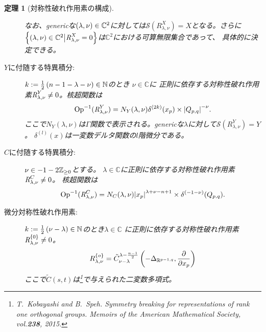 \documentclass[12pt]{msjproc} %
\newcommand{\tmtextit}[1]{{\itshape{#1}}}
\newtheorem{theorem}{定理}
\newtheorem{corollary}{系}
\theoremstyle{definition}
\newcommand{\Hom}{\mbox{\normalfont Hom}}
\newcommand{\Op}{\mbox{\normalfont Op}}
\newcommand{\OpR}{\mbox{\it R}}
\theoremstyle{remark}
\begin{document}
\begin{theorem}[対称性破れ作用素の構成]
\begin{description}
				なお、genericな$(\lambda,\nu)\in\mathbb{C}^2$に対しては$\mathcal{S}(R_{\lambda,\nu}^X)=X$となる。さらに
				$\mysetn{(\lambda,\nu)\in\mathbb{C}^2}{\OpR^{X}_{\lambda,\nu}=0}$は$\mathbb{C}^2$における可算無限集合であって、
				具体的に決定できる。
				\newcommand{\sniptA}{$k:=\frac{1}{2}\left( n-1-\lambda-\nu \right)\in\N$のとき}
				\newcommand{\sniptB}{核超関数は}
				\newcommand{\sniptE}{\sniptB}
				\newcommand{\sniptC}{ここで$N_Y(\lambda,\nu)$は$\Gamma$関数で表示される}
				\newcommand{\sniptF}{genericな$\lambda$に対して$\mathcal{S}\left( R_{\lambda,\nu}^C \right)=C$}
				\newcommand{\sniptD}{genericな$\lambda$に対して$\mathcal{S}\left( R_{\lambda,\nu}^Y \right)=Y$}
				\newcommand{\sniptG}{$k:=\frac{1}{2}\left( \nu-\lambda \right)\in\N$のとき}
				\newcommand{\sniptH}{R_{\lambda,\nu}^{ \left\{ o \right\}}=\tilde{C}_{\nu-\lambda}^{\lambda-\frac{n-1}{2}}\mybra{-\Delta_{\R^{p-1,q}},\frac{\partial}{\partial x_p}}}
			\item[$Y$に付随する特異積分:]
				\sniptA
				$\nu\in\mathbb{C}$に
				正則に依存する対称性破れ作用素$\OpR^{Y}_{\lambda,\nu}\neq0$。\sniptB
					\vspace{-1.8ex}
						\[\Op^{-1}(\OpR^{Y}_{\lambda,\nu})={N_Y(\lambda,\nu)}{\delta^{(2k)}(x_p)\times\myabs{Q_{p,q}}
							^{-\nu}}.\]
							\sniptC。\sniptD。
				$\delta^{(l)}(x)$は一変数デルタ関数の$l$階微分である。
			\item[$C$に付随する特異積分:]
				$\nu\in-1-2\mathbb{Z}_{\ge0}$とする。
				$\lambda\in \mathbb{C}$に正則に依存する対称性破れ作用素$\OpR^{C}_{\lambda,\nu}\neq0$。
				\sniptE
				 \vspace{-1.8ex}
					 \[\Op^{-1}(\OpR^{C}_{\lambda,\nu})={N_C
						(\lambda,\nu)}{\myabs{x_p}^{\lambda+\nu-n+1}\times\delta^{(-1-\nu)}(Q_{p,q}) }.\]
			\item[微分対称性破れ作用素:] 
				\sniptG$\lambda\in\mathbb{C}$
				に正則に依存する対称性破れ作用素$\OpR^{ \left\{ 0 \right\} }_{\lambda,\nu}\neq0$。
				\[\sniptH\]
				ここで$\tilde{C}(s,t)$は{\normalfont [KS15,(16.3)]}\footnote{\label{note1}T.~Kobayashi and B.~Speh.
  {\newblock}Symmetry breaking for representations of rank one orthogonal
  groups. {\newblock}\tmtextit{Memoirs of the American Mathematical Society},
  vol.{\bf 238}, 2015.
}で与えられた二変数多項式。
	\end{description}
\end{theorem}
				\newcommand{\sniptI}[1]{\begin{corollary}
					\[\dim\Hom_{G'}\left( I(\lambda),J(\nu) \right)\in\left\{ 1,2 \right\}\quad\left( \forall\lambda,\forall\nu\in\C \right).\]
					等号成立#1
			\end{corollary}}
\end{document}
